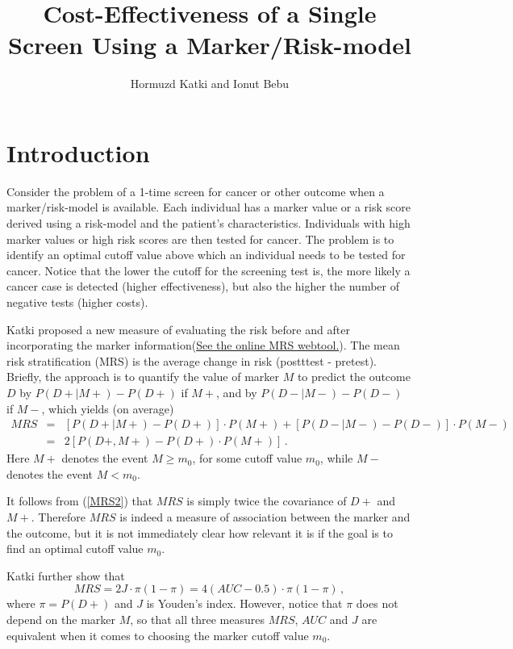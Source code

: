 \documentclass[11pt]{article}
\begin{document}


\title{Cost-Effectiveness of a Single Screen Using a Marker/Risk-model}
\author{Hormuzd Katki and Ionut Bebu}
\maketitle

\section{Introduction}
Consider the problem of a 1-time screen for cancer or other outcome when a marker/risk-model is available. Each individual has a marker value or a risk score derived using a risk-model and the patient's characteristics. Individuals with high marker values or high risk scores are then tested for cancer. The problem is to identify an optimal cutoff value above which an individual needs to be tested for cancer. Notice that the lower the cutoff for the screening test is, the more likely a cancer case is detected (higher effectiveness), but also the higher the number of negative tests (higher costs). 

Katki \cite{katki} proposed a new measure of evaluating the risk before and after incorporating the marker information(\href{http://analysistools.nci.nih.gov/biomarkerTools}{See the online MRS webtool.}). The mean risk stratification (MRS) is the average change in risk (postttest - pretest). Briefly, the approach is to quantify the value of marker $M$ to predict the outcome $D$ by $P(D+|M+) - P(D+)$ if $M+$, and by $P(D-|M-) - P(D-)$ if $M-$, which yields (on average)
\begin{eqnarray}\label{MRS}
MRS &=& [P(D+|M+) - P(D+)]\cdot P(M+) + [P(D-|M-) - P(D-)]\cdot P(M-)\\    \label{MRS2}
    &=& 2[P(D+,M+) - P(D+)\cdot P(M+)]\,. 
\end{eqnarray} 
Here $M+$ denotes the event $M\geq m_0$, for some cutoff value $m_0$, while $M-$ denotes the event $M< m_0$.

It follows from (\ref{MRS2}) that $MRS$ is simply twice the covariance of $D+$ and $M+$. Therefore $MRS$ is indeed a measure of association between the marker and the outcome, but it is not immediately clear how relevant it is if the goal is to find an optimal cutoff value $m_0$. 

Katki \cite{katki} further show that 
\begin{equation}\label{MRS_AUC}
MRS=2J\cdot \pi(1-\pi)=4(AUC-0.5)\cdot \pi(1-\pi)\,,
\end{equation}
where $\pi=P(D+)$ and $J$ is Youden's index. However, notice that $\pi$ does not depend on the marker $M$, so that all three measures $MRS$, $AUC$ and $J$ are equivalent when it comes to choosing the marker cutoff value $m_0$. 
\end{document}
